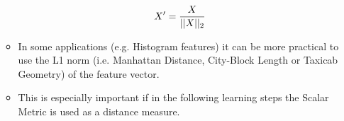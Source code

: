 \documentclass[11pt]{article}
\begin{document}
\begin{itemize}
\begin{itemize}
            \begin{equation} \label{eq:standardization_scaling_to_unit_length}
                \large{ X' = \frac{ X } { ||X||_2 } }
            \end{equation}
            \item In some applications (e.g. Histogram features) it can be more practical to use the L1 norm (i.e. Manhattan Distance, City-Block Length or Taxicab Geometry) of the feature vector.
            \item This is especially important if in the following learning steps the Scalar Metric is used as a distance measure.
        \end{itemize}
    \end{itemize}

    
    
\end{document}
